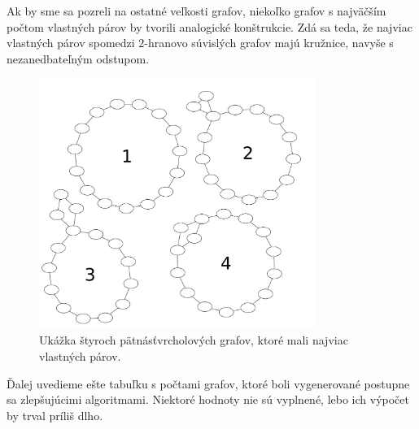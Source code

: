 Ak by sme sa pozreli na ostatné veľkosti grafov, niekoľko grafov s najväčším počtom vlastných párov
by tvorili analogické konštrukcie. Zdá sa teda, že najviac vlastných párov spomedzi $2$-hranovo súvislých
grafov majú kružnice, navyše s nezanedbateľným odstupom.

\begin{figure}
\centerline{\includegraphics[width=0.8\textwidth]{images/best_ec2.pdf}}

\caption[$2$-hranovo súvislé grafy s najviac vlastnými pármi]{Ukážka štyroch pätnásťvrcholových
grafov, ktoré mali najviac vlastných párov.}

\label{graf:bestec2}
\end{figure}

Ďalej uvedieme ešte tabuľku s počtami grafov, ktoré boli vygenerované postupne sa zlepšujúcimi
algoritmami. Niektoré hodnoty nie sú vyplnené, lebo ich výpočet by trval príliš dlho.

